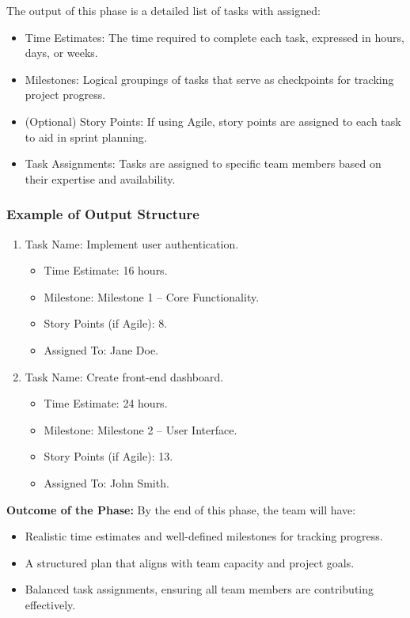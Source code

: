 \documentclass[14pt, a4paper]{article}
\begin{document}
The output of this phase is a detailed list of tasks with assigned:

\begin{itemize}
    \item Time Estimates: The time required to complete each task, expressed in
    hours, days, or weeks.
    \item Milestones: Logical groupings of tasks that serve as checkpoints for
    tracking project progress.
    \item (Optional) Story Points: If using Agile, story points are assigned to
    each task to aid in sprint planning.
    \item Task Assignments: Tasks are assigned to specific team members based on
    their expertise and availability.
\end{itemize}

\subsubsection*{Example of Output Structure}

\begin{enumerate}
    \item Task Name: Implement user authentication.
    \begin{itemize}
        \item Time Estimate: 16 hours.
        \item Milestone: Milestone 1 – Core Functionality.
        \item Story Points (if Agile): 8.
        \item Assigned To: Jane Doe.
    \end{itemize}
    \item Task Name: Create front-end dashboard.
    \begin{itemize}
        \item Time Estimate: 24 hours.
        \item Milestone: Milestone 2 – User Interface.
        \item Story Points (if Agile): 13.
        \item Assigned To: John Smith.
    \end{itemize}
\end{enumerate}

\textbf{Outcome of the Phase:} By the end of this phase, the team will have:

\begin{itemize}
    \item Realistic time estimates and well-defined milestones for tracking
    progress.
    \item A structured plan that aligns with team capacity and project goals.
    \item Balanced task assignments, ensuring all team members are contributing
    effectively.
\end{itemize}
\end{document}
